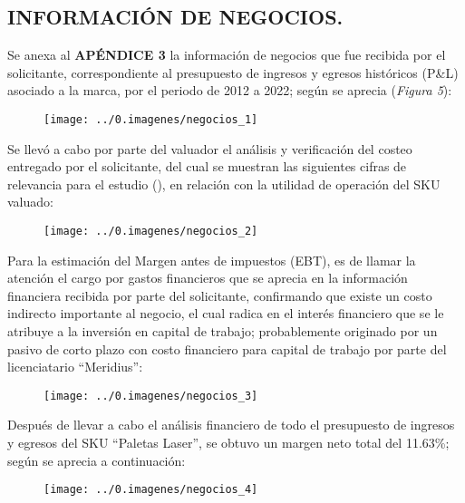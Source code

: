 \begin{leftcolumn}

\subsection{INFORMACIÓN DE NEGOCIOS.}

Se anexa al \textbf{APÉNDICE 3} la información de negocios que fue recibida por el solicitante, correspondiente al presupuesto de ingresos y egresos históricos (P\&L) asociado a la marca, por el periodo de 2012 a 2022; según se aprecia (\textcolor{principal}{\textit{Figura 5}}):\\

\begin{figure}[H]

\texttt{[image: ../0.imagenes/negocios\_1]}
\end{figure} 

Se llevó a cabo por parte del valuador el análisis y verificación del costeo entregado por el solicitante, del cual se muestran las siguientes cifras de relevancia para el estudio (), en relación con la utilidad de operación del SKU valuado:\\

\begin{figure}[H]

\texttt{[image: ../0.imagenes/negocios\_2]}
\end{figure} 

Para la estimación del Margen antes de impuestos (EBT), es de llamar la atención el cargo por gastos financieros que se aprecia en la información financiera recibida por parte del solicitante, confirmando que existe un costo indirecto importante al negocio, el cual radica en el interés financiero que se le atribuye a la inversión en capital de trabajo; probablemente originado por un pasivo de corto plazo con costo financiero para capital de trabajo por parte del licenciatario ``Meridius'': \\

\begin{figure}[H]

\texttt{[image: ../0.imagenes/negocios\_3]}
\end{figure} 

Después de llevar a cabo el análisis financiero de todo el presupuesto de ingresos y egresos del SKU ``Paletas Laser'', se obtuvo un margen neto total del 11.63\%; según se aprecia a continuación:

\begin{figure}[H]

\texttt{[image: ../0.imagenes/negocios\_4]}
\end{figure} 

\end{leftcolumn}


